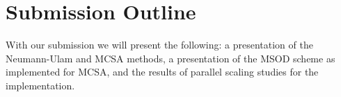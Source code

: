 \documentclass{snamc2013}
\begin{document}
\section{Submission Outline}

With our submission we will present the following: a presentation of
the Neumann-Ulam and MCSA methods, a presentation of the MSOD scheme
as implemented for MCSA, and the results of parallel scaling studies
for the implementation.



\end{document}
